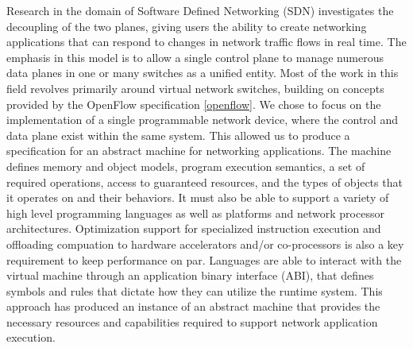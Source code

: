 Research in the domain of Software Defined Networking (SDN) investigates the decoupling of the two planes, giving users the ability to create networking applications that can respond to changes in network traffic flows in real time. The emphasis in this model is to allow a single control plane to manage numerous data planes in one or many switches as a unified entity. Most of the work in this field revolves primarily around virtual network switches, building on concepts provided by the OpenFlow specification \ref{openflow}. We chose to focus on the implementation of a single programmable network device, where the control and data plane exist within the same system. This allowed us to produce a specification for an abstract machine for networking applications. The machine defines memory and object models, program execution semantics, a set of required operations, access to guaranteed resources, and the types of objects that it operates on and their behaviors. It must also be able to support a variety of high level programming languages as well as platforms and network processor architectures. Optimization support for specialized instruction execution and offloading compuation to hardware accelerators and/or co-processors is also a key requirement to keep performance on par. Languages are able to interact with the virtual machine through an application binary interface (ABI), that defines symbols and rules that dictate how they can utilize the runtime system. This approach has produced an instance of an abstract machine that provides the necessary resources and capabilities required to support network application execution.




